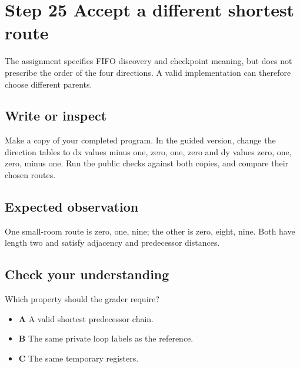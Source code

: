 \section{Step 25 Accept a different shortest route}\label{maze-s25}

The assignment specifies FIFO discovery and checkpoint meaning, but does not prescribe the order of the four directions. A valid implementation can therefore choose different parents.

\subsection{Write or inspect}

Make a copy of your completed program. In the guided version, change the direction tables to dx values minus one, zero, one, zero and dy values zero, one, zero, minus one. Run the public checks against both copies, and compare their chosen routes.

\subsection{Expected observation}

One small-room route is zero, one, nine; the other is zero, eight, nine. Both have length two and satisfy adjacency and predecessor distances.

\subsection{Check your understanding}

Which property should the grader require?

\begin{itemize}
  \item \textbf{A} A valid shortest predecessor chain.
  \item \textbf{B} The same private loop labels as the reference.
  \item \textbf{C} The same temporary registers.
\end{itemize}
